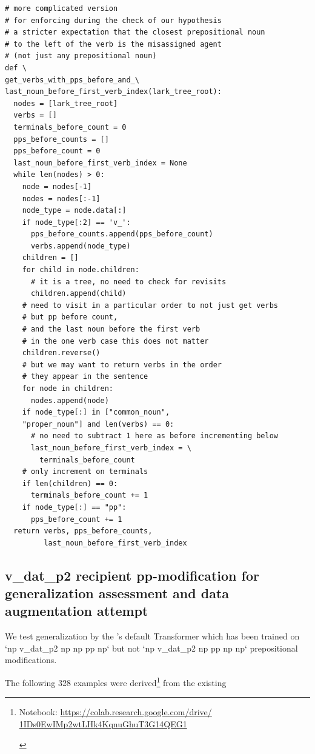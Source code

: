 \documentclass[11pt]{article}
\begin{document}
\begin{tiny}
\begin{verbatim}
# more complicated version
# for enforcing during the check of our hypothesis
# a stricter expectation that the closest prepositional noun
# to the left of the verb is the misassigned agent
# (not just any prepositional noun)
def \
get_verbs_with_pps_before_and_\
last_noun_before_first_verb_index(lark_tree_root):
  nodes = [lark_tree_root]
  verbs = []
  terminals_before_count = 0
  pps_before_counts = []
  pps_before_count = 0
  last_noun_before_first_verb_index = None
  while len(nodes) > 0:
    node = nodes[-1]
    nodes = nodes[:-1]
    node_type = node.data[:]
    if node_type[:2] == 'v_':
      pps_before_counts.append(pps_before_count)
      verbs.append(node_type)
    children = []
    for child in node.children:
      # it is a tree, no need to check for revisits
      children.append(child)
    # need to visit in a particular order to not just get verbs
    # but pp before count, 
    # and the last noun before the first verb
    # in the one verb case this does not matter 
    children.reverse()
    # but we may want to return verbs in the order
    # they appear in the sentence
    for node in children:
      nodes.append(node)
    if node_type[:] in ["common_noun",
    "proper_noun"] and len(verbs) == 0:
      # no need to subtract 1 here as before incrementing below
      last_noun_before_first_verb_index = \
        terminals_before_count
    # only increment on terminals
    if len(children) == 0:
      terminals_before_count += 1
    if node_type[:] == "pp":
      pps_before_count += 1
  return verbs, pps_before_counts,
         last_noun_before_first_verb_index
\end{verbatim}
\end{tiny}

\clearpage
\subsection{v\_dat\_p2 recipient pp-modification for generalization assessment and data augmentation attempt}
\label{v_dat_p2_recipient_pp-modification_for_generalization_assessment_and_data_augmentation_attempt}

We test generalization by the \citep{Wu2023}'s default Transformer which has been trained on `np v\_dat\_p2 np np pp np` but not `np v\_dat\_p2 np pp np np` prepositional modifications.

The following 328 examples were derived\footnote{\begin{footnotesize} Notebook:  \href{https://colab.research.google.com/drive/1IDs0EwIMp2wtLHk4KqnuGhuT3G14QEG1}{https://colab.research.google.com/drive/
1IDs0EwIMp2wtLHk4KqnuGhuT3G14QEG1} \end{footnotesize}} from the existing
\end{document}

